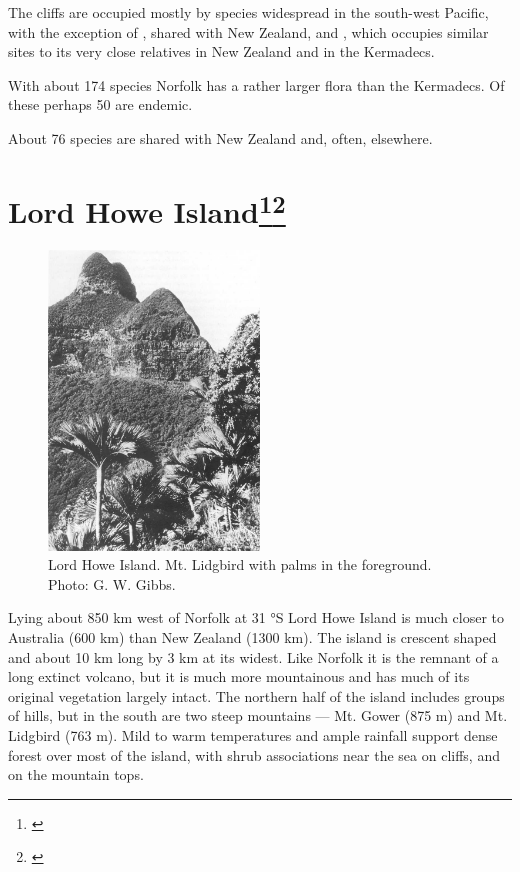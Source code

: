 The cliffs are occupied mostly by species widespread in the south-west Pacific, with the exception of , shared with New Zealand, and , which occupies similar sites to its very close relatives  in New Zealand and  in the Kermadecs.

With about 174 species Norfolk has a rather larger flora than the Kermadecs.
Of these perhaps 50 are endemic.

About 76 species are shared with New Zealand and, often, elsewhere.

\section[Lord Howe Island]{Lord Howe Island\footnote{\cite{oliver1896vegetation}}\footnote{\cite{green1979observations}}}

\begin{figure}
	\includegraphics[width=0.5\textwidth]{graphics/figure120lord-howe-island.jpg}
	\centering
	\caption[Lord Howe Island]{Lord Howe Island.
    Mt. Lidgbird with  palms in the foreground.
	Photo: G. W. Gibbs.}
	\label{fig:120lord-howe-island}
\end{figure}

Lying about 850 km west of Norfolk at 31 °S Lord Howe Island is much closer to Australia (600 km) than New Zealand (1300 km).
The island is crescent shaped and about 10 km long by 3 km at its widest.
Like Norfolk it is the remnant of a long extinct volcano, but it is much more mountainous and has much of its original vegetation largely intact.
The northern half of the island includes groups of hills, but in the south are two steep mountains — Mt.
Gower (875 m) and Mt.
Lidgbird (763 m).
Mild to warm temperatures and ample rainfall support dense forest over most of the island, with shrub associations near the sea on cliffs, and on the mountain tops.

